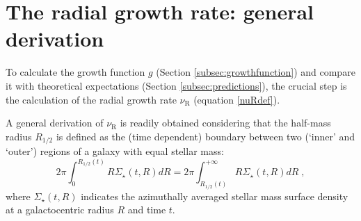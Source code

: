 \documentclass[fleqn,usenatbib]{mnras}
\begin{document}
\section[Radial growth rate: general case]{The radial growth rate: general derivation}\label{sec:RadialGrowthRate}

To calculate the growth function $g$ (Section \ref{subsec:growthfunction}) and compare it with theoretical expectations (Section \ref{subsec:predictions}), the crucial step is the calculation of the radial growth rate $\nu_\textrm{R}$ (equation \ref{nuRdef}).

A general derivation of $\nu_\textrm{R}$ is readily obtained considering that the half-mass radius  $R_{1/2}$ is defined as the (time dependent) boundary between two (`inner' and `outer') regions of a galaxy with equal stellar mass:
\begin{equation}\label{Rhalfdef}
2 \pi \int_0^{R_{1/2}(t)} R \Sigma_\star(t, R) dR = 2 \pi  \int_{R_{1/2}(t)}^{+ \infty} R \Sigma_\star(t, R) dR \; ,
\end{equation}
where $\Sigma_\star(t, R)$ indicates the azimuthally averaged stellar mass surface density at a galactocentric radius $R$ and time $t$.
\end{document}
